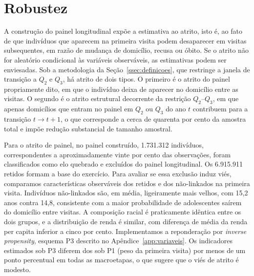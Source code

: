 
\section{Robustez}
\label{sec:robustez}
\label{ssec:atrito}

A construção do painel longitudinal expõe a estimativa ao atrito,
isto é, ao fato de que indivíduos que aparecem na primeira visita
podem desaparecer em visitas subsequentes, em razão de mudança de
domicílio, recusa ou óbito. Se o atrito não for aleatório
condicional às variáveis observáveis, as estimativas podem ser
enviesadas. Sob a metodologia da Seção~\ref{ssec:definicoes}, que
restringe a janela de transição a $Q_2$ e $Q_3$, há atrito de dois
tipos. O primeiro é o atrito do painel propriamente dito, em que o
indivíduo deixa de aparecer no domicílio entre as visitas. O segundo
é o atrito estrutural decorrente da restrição $Q_2$--$Q_3$, em que
apenas domicílios que entram no painel em $Q_2$ ou $Q_3$ do ano $t$
contribuem para a transição $t \to t+1$, o que corresponde a cerca
de quarenta por cento da amostra total e impõe redução substancial
de tamanho amostral.

Para o atrito de painel, no painel construído, 1.731.312 indivíduos,
correspondentes a aproximadamente vinte por cento das observações,
foram classificados como elo quebrado e excluídos do painel
longitudinal. Os 6.915.911 retidos formam a base do exercício. Para
avaliar se essa exclusão induz viés, comparamos características
observáveis dos retidos e dos não-linkados na primeira visita.
Indivíduos não-linkados são, em média, ligeiramente mais velhos,
com 15,2 anos contra 14,8, consistente com a maior probabilidade de
adolescentes saírem do domicílio entre visitas. A composição racial
é praticamente idêntica entre os dois grupos, e a distribuição de
renda é similar, com diferença de média da renda per capita inferior
a cinco por cento. Implementamos a reponderação por \emph{inverse
propensity}, esquema P3 descrito no
Apêndice~\ref{app:variaveis}. Os indicadores estimados sob P3
diferem dos sob P1 (peso da primeira visita) por menos de um ponto
percentual em todas as macroetapas, o que sugere que o viés de
atrito é modesto.

